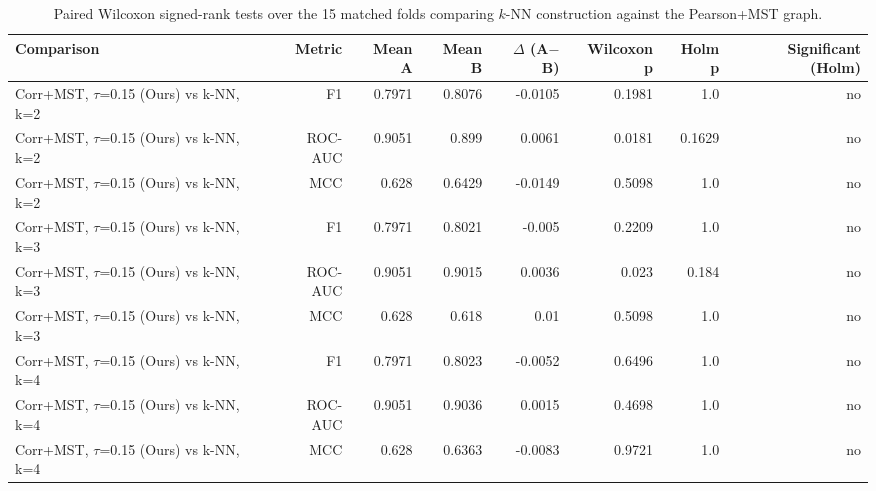 \begin{table}[t]
\centering
\caption{Paired Wilcoxon signed-rank tests over the 15 matched folds comparing $k$-NN construction against the Pearson+MST graph.}
\label{tab:knnstats}
\footnotesize
\begin{tabular}{lrrrrrrr}
\toprule
Comparison & Metric & Mean A & Mean B & $\Delta$ (A$-$B) & Wilcoxon p & Holm p & Significant (Holm) \\
\midrule
Corr+MST, $\tau$=0.15 (Ours) vs k-NN, k=2 & F1 & 0.7971 & 0.8076 & -0.0105 & 0.1981 & 1.0 & no \\
Corr+MST, $\tau$=0.15 (Ours) vs k-NN, k=2 & ROC-AUC & 0.9051 & 0.899 & 0.0061 & 0.0181 & 0.1629 & no \\
Corr+MST, $\tau$=0.15 (Ours) vs k-NN, k=2 & MCC & 0.628 & 0.6429 & -0.0149 & 0.5098 & 1.0 & no \\
Corr+MST, $\tau$=0.15 (Ours) vs k-NN, k=3 & F1 & 0.7971 & 0.8021 & -0.005 & 0.2209 & 1.0 & no \\
Corr+MST, $\tau$=0.15 (Ours) vs k-NN, k=3 & ROC-AUC & 0.9051 & 0.9015 & 0.0036 & 0.023 & 0.184 & no \\
Corr+MST, $\tau$=0.15 (Ours) vs k-NN, k=3 & MCC & 0.628 & 0.618 & 0.01 & 0.5098 & 1.0 & no \\
Corr+MST, $\tau$=0.15 (Ours) vs k-NN, k=4 & F1 & 0.7971 & 0.8023 & -0.0052 & 0.6496 & 1.0 & no \\
Corr+MST, $\tau$=0.15 (Ours) vs k-NN, k=4 & ROC-AUC & 0.9051 & 0.9036 & 0.0015 & 0.4698 & 1.0 & no \\
Corr+MST, $\tau$=0.15 (Ours) vs k-NN, k=4 & MCC & 0.628 & 0.6363 & -0.0083 & 0.9721 & 1.0 & no \\
\bottomrule
\end{tabular}
\end{table}
